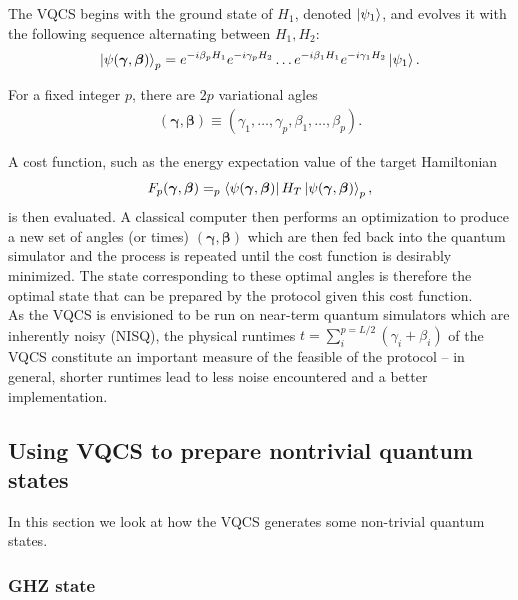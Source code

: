 \documentclass{book}
\theoremstyle{definition}
\begin{document}
The VQCS begins with the ground state of $H_1$, denoted $\ket{\psi_1}$, and evolves it with the following sequence alternating between $H_1, H_2$:
\begin{align}
\ket{\psi(\bm\gamma, \bm\beta)}_p = e^{-i\beta_p H_1}e^{-i\gamma_p H_2}\dots e^{-i \beta_1 H_1}e^{-i \gamma_1 H_2}\ket{\psi_1}.
\end{align}

For a fixed integer $p$, there are $2p$ variational agles 
\begin{align}
(\bm\gamma, \bm\beta) \equiv (\gamma_1,\dots,\gamma_p, \beta_1,\dots, \beta_p).
\end{align}

A cost function, such as the energy expectation value of the target Hamiltonian
\begin{align}
F_p(\bm\gamma, \bm\beta) = _p\bra{ \psi(\bm\gamma,\bm\beta)} H_T \ket{\psi(\bm\gamma,\bm\beta)}_p,
\end{align}
is then evaluated. A classical computer then performs an optimization to produce a new set of angles (or times) $(\bm\gamma, \bm\beta)$ which are then fed back into the quantum simulator and the process is repeated until the cost function is desirably minimized. The state corresponding to these optimal angles is therefore the optimal state that can be prepared by the protocol given this cost function. \\


As the VQCS is envisioned to be run on near-term quantum simulators which are inherently noisy (NISQ), the physical runtimes $t = \sum^{p=L/2}_i (\gamma_i + \beta_i)$ of the VQCS constitute an important measure of the feasible of the protocol -- in general, shorter runtimes lead to less noise encountered and a better implementation.  













\subsection{Using VQCS to prepare nontrivial quantum states}

In this section we look at how the VQCS generates some non-trivial quantum states.


\subsubsection{GHZ state}
\end{document}
